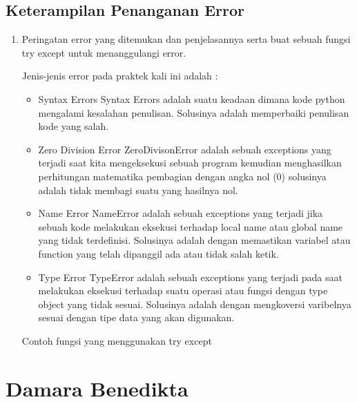 \subsection{Keterampilan Penanganan Error}
\begin{enumerate}
	\item Peringatan error yang ditemukan dan penjelasannya serta buat sebuah fungsi try except untuk menanggulangi error.
	
	Jenis-jenis error pada praktek kali ini adalah :
	\begin{itemize}
	\item Syntax Errors
	Syntax Errors adalah suatu keadaan dimana kode python mengalami kesalahan penulisan. Solusinya adalah memperbaiki penulisan kode yang salah.
	
	\item Zero Division Error
	ZeroDivisonError adalah sebuah exceptions yang terjadi saat kita mengeksekusi sebuah program kemudian menghasilkan perhitungan matematika pembagian dengan angka nol (0) solusinya adalah tidak membagi suatu yang hasilnya nol.
	
	\item Name Error
	NameError adalah sebuah exceptions yang terjadi jika sebuah kode melakukan eksekusi terhadap local name atau global name yang tidak terdefinisi. Solusinya adalah dengan memastikan variabel atau function yang telah dipanggil ada atau tidak salah ketik.
	
	\item Type Error
	TypeError adalah sebuah exceptions yang terjadi pada saat melakukan eksekusi terhadap suatu operasi atau fungsi dengan type object yang tidak sesuai. Solusinya adalah dengan mengkoversi varibelnya sesuai dengan tipe data yang akan digunakan.
	\end{itemize}
	
	Contoh fungsi yang menggunakan try except
	
\end{enumerate}

\section{Damara Benedikta}
